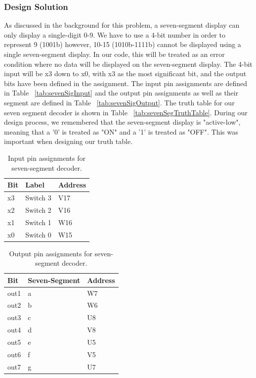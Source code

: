 \documentclass[11pt]{article}
\begin{document}
\subsubsection{Design Solution}
As discussed in the background for this problem, a seven-segment display can only display a single-digit 0-9. We have to use a 4-bit number in order to represent 9 (1001b) however, 10-15 (1010b-1111b) cannot be displayed using a single seven-segment display. In our code, this will be treated as an error condition where no data will be displayed on the seven-segment display. The 4-bit input will be x3 down to x0, with x3 as the most significant bit, and the output bits have been defined in the assignment. The input pin assignments are defined in Table ~\ref{tab:sevenSigInput} and the output pin assignments as well as their segment are defined in Table ~\ref{tab:sevenSigOutput}. The truth table for our seven segment decoder is shown in Table ~\ref{tab:sevenSegTruthTable}. During our design process, we remembered that the seven-segment display is "active-low", meaning that a '0' is treated as "ON" and a '1' is treated as "OFF". This was important when designing our truth table.

\begin{table}[h]
\begin{center}
	\begin{tabular}{| l | l | l |}
		\hline
		Bit & Label & Address \\ \hline
		x3 & Switch 3 & V17 \\ \hline
		x2 & Switch 2 & V16 \\ \hline
		x1 & Switch 1 & W16 \\ \hline
		x0 & Switch 0 & W15 \\ \hline
	\end{tabular}
	\caption{\label{tab:table-name}Input pin assignments for seven-segment decoder.}
	\label{tab:sevenSegInput}
\end{center}
\end{table}

\begin{table}[h]
\begin{center}
	\begin{tabular}{| l | l | l |}
		\hline
		Bit & Seven-Segment & Address \\ \hline
		out1 & a & W7 \\ \hline
		out2 & b & W6 \\ \hline
		out3 & c & U8 \\ \hline
		out4 & d & V8 \\ \hline
		out5 & e & U5 \\ \hline
		out6 & f & V5 \\ \hline
		out7 & g & U7 \\ \hline
	\end{tabular}
	\caption{\label{tab:table-name}Output pin assignments for seven-segment decoder.}
	\label{tab:sevenSegOutput}
\end{center}
\end{table}
\end{document}
